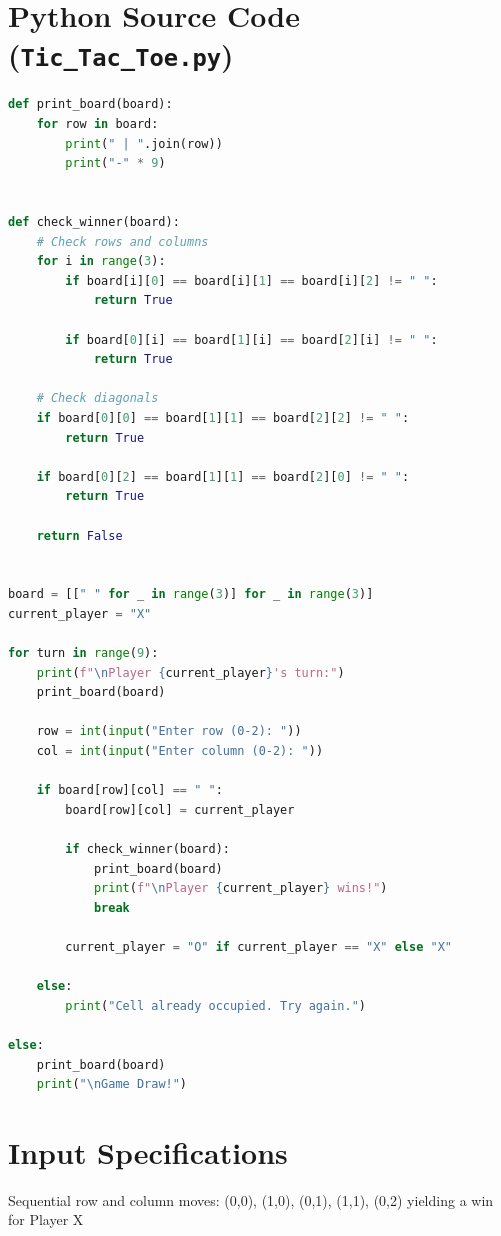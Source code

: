 \documentclass[11pt,a4paper]{report}
\begin{document}
\section{Python Source Code (\texttt{Tic_Tac_Toe.py})}
\begin{lstlisting}[language=Python]
def print_board(board):
    for row in board:
        print(" | ".join(row))
        print("-" * 9)


def check_winner(board):
    # Check rows and columns
    for i in range(3):
        if board[i][0] == board[i][1] == board[i][2] != " ":
            return True

        if board[0][i] == board[1][i] == board[2][i] != " ":
            return True

    # Check diagonals
    if board[0][0] == board[1][1] == board[2][2] != " ":
        return True

    if board[0][2] == board[1][1] == board[2][0] != " ":
        return True

    return False


board = [[" " for _ in range(3)] for _ in range(3)]
current_player = "X"

for turn in range(9):
    print(f"\nPlayer {current_player}'s turn:")
    print_board(board)

    row = int(input("Enter row (0-2): "))
    col = int(input("Enter column (0-2): "))

    if board[row][col] == " ":
        board[row][col] = current_player

        if check_winner(board):
            print_board(board)
            print(f"\nPlayer {current_player} wins!")
            break

        current_player = "O" if current_player == "X" else "X"

    else:
        print("Cell already occupied. Try again.")

else:
    print_board(board)
    print("\nGame Draw!")
\end{lstlisting}

\section{Input Specifications}
Sequential row and column moves: (0,0), (1,0), (0,1), (1,1), (0,2) yielding a win for Player X
\end{document}
